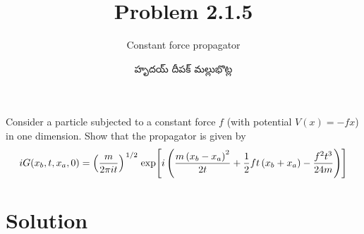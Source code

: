 \documentclass{article}
\title{Problem 2.1.5}
\subtitle{Constant force propagator}
\author{\begin{telugu}హృదయ్ దీపక్ మల్లుభొట్ల\end{telugu}}
\date{}
\begin{document}
	\maketitle
	Consider a particle subjected to a constant force $f$ (with potential $V(x) = - f x$) in one dimension.
	Show that the propagator is given by
	\begin{equation}
		i G(x_b, t, x_a, 0) = \left(\frac{m}{2 \pi i t}\right)^{\flatfrac12} \exp[i\left(\frac{m \left(x_b - x_a \right)^2}{2t} + \frac12 f t \left(x_b + x_a \right) - \frac{f^2 t^3}{24 m} \right)]
	\end{equation}
	\section{Solution} \label{sec:solution}
\end{document}
